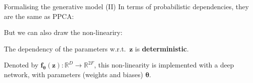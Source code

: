 \documentclass[11pt,aspectratio=169,usenames,dvipsnames]{beamer}
\newcommand{\bs}{\boldsymbol}
\begin{document}
\begin{frame}{Formalising the generative model (II)}
  In terms of probabilistic dependencies, they are the same as PPCA:\vspace{3mm}\\

  But we can also draw the non-lineariry:\vspace{3mm}\\
  \vspace{3mm}

  The dependency of the parameters w.r.t.\ $\bs{z}$ is \textbf{deterministic}.\vspace{3mm}

  Denoted by $\bs{f}_{\bs{\theta}}(\bs{z}):\mathbb{R}^{D}\rightarrow\mathbb{R}^{2F}$, this non-linearity is implemented with a deep network, with parameters (weights and biases) $\bs{\theta}$.

\end{frame}
\end{document}

